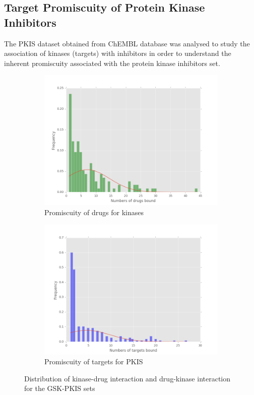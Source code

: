 \documentclass[a4paper, 11pt]{article}
\begin{document}
\subsection*{Target Promiscuity of Protein Kinase Inhibitors}
The PKIS dataset obtained from ChEMBL database was analysed to study the association of kinases (targets) with inhibitors in order to understand the inherent promiscuity associated with the protein kinase inhibitors set. 

\begin{figure}[H]
\centering
\begin{subfigure}{.6\textwidth}
  \centering
  \includegraphics[width=\linewidth]{figures/numb_drugs.png}
  \caption{Promiscuity of drugs for kinases}
  \label{targ_drugdis}
\end{subfigure}%
\begin{subfigure}{.6\textwidth}
  \centering
  \includegraphics[width=\linewidth]{figures/num_target.png}
    \caption{Promiscuity of targets for PKIS}
  \label{drugtarg}
\end{subfigure}
\caption{Distribution of kinase-drug interaction and drug-kinase interaction for the GSK-PKIS sets}
\label{targ_dis}
\end{figure}
\end{document}
